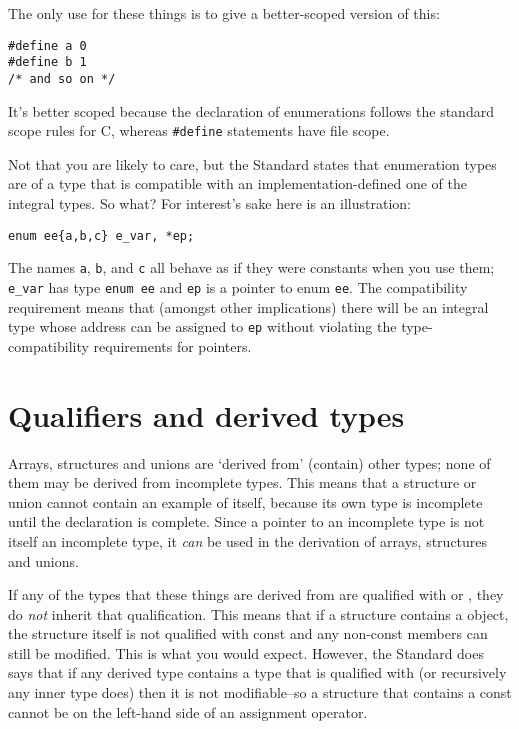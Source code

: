   The only use for these things is to give a better-scoped version of
   this:


  \begin{Verbatim}
#define a 0
#define b 1
/* and so on */
\end{Verbatim}

  It's better scoped because the declaration of enumerations follows the
   standard scope rules for C, whereas \texttt{\#define} statements have
   file scope.


  Not that you are likely to care, but the Standard states that enumeration
   types are of a type that is compatible with an implementation-defined one of
   the integral types. So what? For interest's sake here is an
   illustration:


  \begin{Verbatim}
enum ee{a,b,c} e_var, *ep;
\end{Verbatim}

  The names \texttt{a}, \texttt{b}, and \texttt{c} all behave as
   if they were \kint{} constants when you use them;
   \texttt{e\_var} has type \texttt{enum ee} and \texttt{ep} is
   a pointer to enum \texttt{ee}. The compatibility requirement means that
   (amongst other implications) there will be an integral type whose address
   can be assigned to \texttt{ep} without violating the type-compatibility
   requirements for pointers.


 
        \section{Qualifiers and derived types}
        

  

  Arrays, structures and unions are `derived from' (contain) other
   types; none of them may be derived from incomplete types. This means that
   a structure or union cannot contain an example of itself, because its own
   type is incomplete until the declaration is complete. Since a pointer to an
   incomplete type is not itself an incomplete type, it \textit{can} be used in
   the derivation of arrays, structures and unions.


  If any of the types that these things are derived from are qualified with
   \const{} or \volatile, they do \textit{not} inherit
   that qualification. This means that if a structure contains
   a \const{} object, the structure itself is not qualified with
   const and any non-const members can still be modified. This is what you
   would expect. However, the Standard does says that if any derived type
   contains a type that is qualified with \const{} (or recursively
   any inner type does) then it is not modifiable--so a structure that
   contains a const cannot be on the left-hand side of an assignment
   operator.


